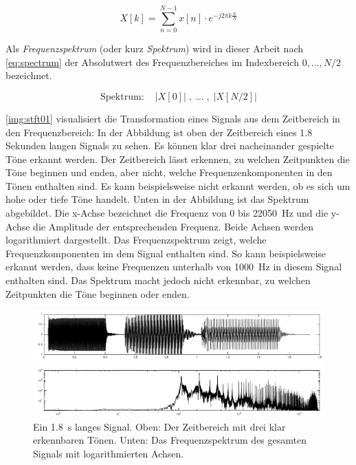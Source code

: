 \begin{equation}
\label{eq:complexDFTpolar}
X[k] =  \sum_{n = 0}^{N-1}  x[n] \cdot e^{-j 2\pi k \frac{n}{N}}
\end{equation}

Als \emph{Frequenzspektrum} (oder kurz \emph{Spektrum}) wird in dieser Arbeit nach \autoref{eq:spectrum} der Absolutwert des Frequenzbereiches im Indexbereich $0, \ldots , N/2$ bezeichnet.

\begin{equation}
\label{eq:spectrum}
\text{Spektrum} : \quad |X[0]| \; , \; \ldots \; , \; |X[N/2]|
\end{equation}

\autoref{img:stft01} visualisiert die Transformation eines Signals aus dem Zeitbereich in den Frequenzbereich: In der Abbildung ist oben der Zeitbereich eines 1.8 Sekunden langen Signals zu sehen. Es können klar drei nacheinander gespielte Töne erkannt werden. Der Zeitbereich lässt erkennen, zu welchen Zeitpunkten die Töne beginnen und enden, aber nicht, welche Frequenzenkomponenten in den Tönen enthalten sind. Es kann beispielsweise nicht erkannt werden, ob es sich um hohe oder tiefe Töne handelt. Unten in der Abbildung ist das Spektrum abgebildet. Die x-Achse bezeichnet die Frequenz von 0 bis \SI{22050}{\hertz} und die y-Achse die Amplitude der entsprechenden Frequenz. Beide Achsen werden logarithmiert dargestellt. Das Frequenzspektrum zeigt, welche Frequenzkomponenten im dem Signal enthalten sind. So kann beispielsweise erkannt werden, dass keine Frequenzen unterhalb von \SI{1000}{\hertz} in diesem Signal enthalten sind. Das Spektrum macht jedoch nicht erkennbar, zu welchen Zeitpunkten die Töne beginnen oder enden. 

\begin{figure}[h]
	\centering
	\includegraphics[width=1\textwidth]{bilder/stft01.png}
	\caption[Beispiel für die DFT]{Ein \SI{1.8}{\second} langes Signal. Oben: Der Zeitbereich mit drei klar erkennbaren Tönen. Unten: Das Frequenzspektrum des gesamten Signals mit logarithmierten Achsen.}
	\label{img:stft01}
\end{figure}

